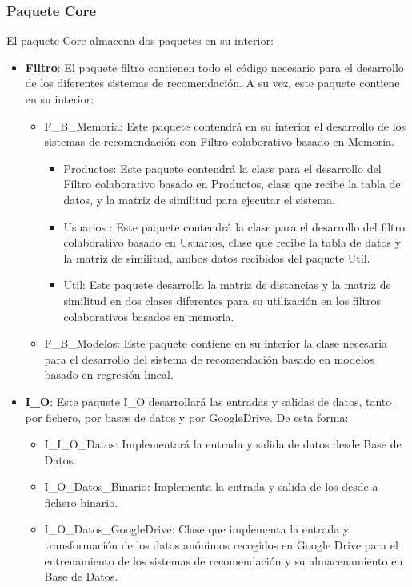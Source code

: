 \subsubsection{Paquete Core}
El paquete Core almacena dos paquetes en su interior: 
\begin{itemize}
\item \textbf{Filtro}: El paquete filtro contienen todo el código necesario para el desarrollo de los diferentes sistemas de recomendación. A su vez, este paquete contiene en su interior: 
\begin{itemize}
\item F\_B\_Memoria: Este paquete contendrá en su interior el desarrollo de los sistemas de recomendación con Filtro colaborativo basado en Memoria. 
\begin{itemize}
\item Productos: Este paquete contendrá la clase para el desarrollo del  Filtro colaborativo basado en Productos, clase que recibe la tabla de datos, y la matriz de similitud para ejecutar el sistema. 
\item Usuarios : Este paquete contendrá la clase para el desarrollo del filtro colaborativo basado en Usuarios, clase que recibe la tabla de datos y la matriz de similitud, ambos datos recibidos del paquete Util. 
\item Util: Este paquete desarrolla la matriz de distancias y la matriz de similitud en dos clases diferentes para  su utilización en los filtros colaborativos basados en memoria.  
\end{itemize}
\item F\_B\_Modelos: Este paquete contiene en su interior la clase necesaria para el desarrollo del sistema de recomendación basado en modelos basado en regresión lineal. 
\end{itemize}
\item \textbf{I\_O}: Este paquete I\_O desarrollará las entradas y salidas de datos, tanto por fichero, por bases de datos y por GoogleDrive. De esta forma:
\begin{itemize}
\item I\_I\_O\_Datos: Implementará la entrada y salida de datos desde Base de Datos. 
\item I\_O\_Datos\_Binario: Implementa la entrada y salida de los desde-a fichero binario. 
\item I\_O\_Datos\_GoogleDrive: Clase que implementa la entrada y transformación de los datos anónimos recogidos en Google Drive para el entrenamiento de los sistemas de recomendación y su almacenamiento en Base de Datos. 
\end{itemize} 
\end{itemize}

